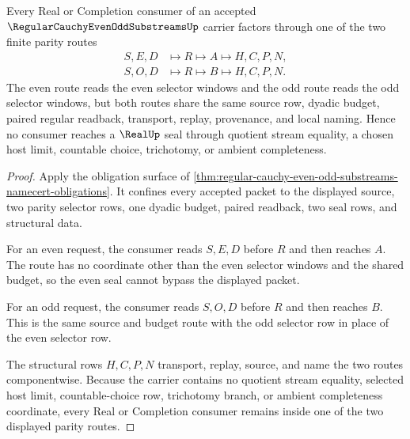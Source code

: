\begin{theorem}
\label{thm:regular-cauchy-even-odd-substreams-real-seal-nonescape}
Every Real or Completion consumer of an accepted $\RegularCauchyEvenOddSubstreamsUp$ carrier factors through one of the two finite parity routes
$$
\begin{aligned}
S,E,D &\longmapsto R \longmapsto A \longmapsto H,C,P,N,\\
S,O,D &\longmapsto R \longmapsto B \longmapsto H,C,P,N.
\end{aligned}
$$
The even route reads the even selector windows and the odd route reads the odd selector windows, but both routes share the same source row, dyadic budget, paired regular readback, transport, replay, provenance, and local naming. Hence no consumer reaches a $\RealUp$ seal through quotient stream equality, a chosen host limit, countable choice, trichotomy, or ambient completeness.
\end{theorem}
\begin{proof}
Apply the obligation surface of \autoref{thm:regular-cauchy-even-odd-substreams-namecert-obligations}. It confines every accepted packet to the displayed source, two parity selector rows, one dyadic budget, paired readback, two seal rows, and structural data.

For an even request, the consumer reads $S,E,D$ before $R$ and then reaches $A$. The route has no coordinate other than the even selector windows and the shared budget, so the even seal cannot bypass the displayed packet.

For an odd request, the consumer reads $S,O,D$ before $R$ and then reaches $B$. This is the same source and budget route with the odd selector row in place of the even selector row.

The structural rows $H,C,P,N$ transport, replay, source, and name the two routes componentwise. Because the carrier contains no quotient stream equality, selected host limit, countable-choice row, trichotomy branch, or ambient completeness coordinate, every Real or Completion consumer remains inside one of the two displayed parity routes.
\end{proof}

